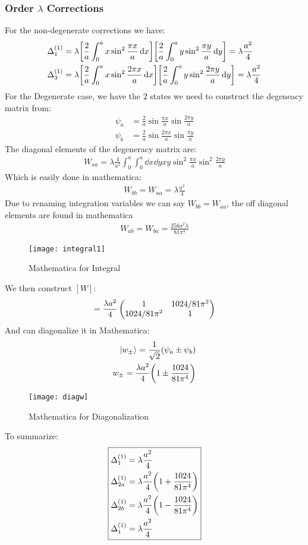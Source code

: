 \documentclass[12pt]{article}
\begin{document}
\subsubsection{Order $\lambda$ Corrections}
For the non-degenerate corrections we have:
\begin{align*}
  \Delta_1^{(1)}&=\lambda\qty[\frac2a\int_0^ax\sin^2\frac{\pi x}a\dd{x}]
  \qty[\frac2a\int_0^ay\sin^2\frac{\pi y}a\dd{y}]=
  \lambda\frac{a^2}4\\
  \Delta_3^{(1)}&=\lambda\qty[\frac2a\int_0^ax\sin^2\frac{2\pi x}a\dd{x}]
  \qty[\frac2a\int_0^ay\sin^2\frac{2\pi y}a\dd{y}]=
  \lambda\frac{a^2}4
\end{align*}
For the Degenerate case, we have the 2 states we need to construct the degeneacy matrix from:
\begin{align*}
  \psi_a&=\frac2a\sin\frac{\pi x}a\sin\frac{2\pi y}a\\
  \psi_b&=\frac2a\sin\frac{2\pi x}a\sin\frac{\pi y}a
\end{align*}
The diagonal elements of the degeneracy matrix are:
\begin{align*}
  W_{aa}=\lambda\frac4{a^2}\int_0^a\int_0^a\dd{x}\dd{y}
  xy\sin^2\frac{\pi x}a\sin^2\frac{2\pi y}a
\end{align*}
Which is easily done in mathematica:
\begin{align*}
  W_{bb}=W_{aa}=\lambda\frac{a^2}{4}
\end{align*}
Due to renaming integration variables we can say $W_{bb}=W_{aa}$, the off diagonal elements are found in mathematica
\begin{align*}
  W_{ab}=W_{ba}=\frac{256a^2\lambda}{81\pi^4}
\end{align*}
\begin{figure}[H]
  \centering
  \texttt{[image: integral1]}
  \caption{Mathematica for Integral}
\end{figure}
We then construct $[W]$:
\begin{align*}
  [W]=\frac{\lambda a^2}{4}\pmqty{1 & 1024/81\pi^2 \\ 1024/81\pi^2 & 1}
\end{align*}
And can diagonalize it in Mathematica:
\begin{align*}
  \ket{w_\pm}=\frac1{\sqrt{2}}\qty(\psi_a\pm\psi_b)\\
  w_\pm=\frac{\lambda a^2}{4}\qty(1\pm\frac{1024}{81\pi^4})
\end{align*}
\begin{figure}[H]
  \centering
  \texttt{[image: diagw]}
  \caption{Mathematica for Diagonalization}
\end{figure}
To summarize:
\begin{equation}
  \boxed{\begin{aligned}
      \Delta_1^{(1)}&=\lambda\frac{a^2}{4}\\
      \Delta_{2a}^{(1)}&=\lambda\frac{a^2}{4}\qty(1+\frac{1024}{81\pi^4})\\
      \Delta_{2b}^{(1)}&=\lambda\frac{a^2}{4}\qty(1-\frac{1024}{81\pi^4})\\
      \Delta_1^{(1)}&=\lambda\frac{a^2}{4}
  \end{aligned}}
\end{equation}
\end{document}
